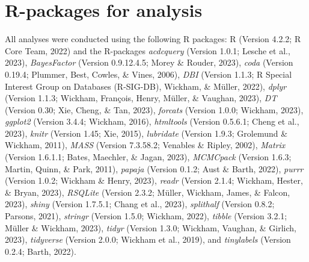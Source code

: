 \documentclass[
  man,floatsintext]{apa6}
\begin{document}
\begin{center}
\begin{ThreePartTable}
{}

\end{ThreePartTable}
\end{center}

\hypertarget{r-packages-for-analysis}{%
\section{R-packages for analysis}\label{r-packages-for-analysis}}

All analyses were conducted using the following R packages: R (Version 4.2.2; R Core Team, 2022) and the R-packages \emph{acdcquery} (Version 1.0.1; Lesche et al., 2023), \emph{BayesFactor} (Version 0.9.12.4.5; Morey \& Rouder, 2023), \emph{coda} (Version 0.19.4; Plummer, Best, Cowles, \& Vines, 2006), \emph{DBI} (Version 1.1.3; R Special Interest Group on Databases (R-SIG-DB), Wickham, \& Müller, 2022), \emph{dplyr} (Version 1.1.3; Wickham, François, Henry, Müller, \& Vaughan, 2023), \emph{DT} (Version 0.30; Xie, Cheng, \& Tan, 2023), \emph{forcats} (Version 1.0.0; Wickham, 2023), \emph{ggplot2} (Version 3.4.4; Wickham, 2016), \emph{htmltools} (Version 0.5.6.1; Cheng et al., 2023), \emph{knitr} (Version 1.45; Xie, 2015), \emph{lubridate} (Version 1.9.3; Grolemund \& Wickham, 2011), \emph{MASS} (Version 7.3.58.2; Venables \& Ripley, 2002), \emph{Matrix} (Version 1.6.1.1; Bates, Maechler, \& Jagan, 2023), \emph{MCMCpack} (Version 1.6.3; Martin, Quinn, \& Park, 2011), \emph{papaja} (Version 0.1.2; Aust \& Barth, 2022), \emph{purrr} (Version 1.0.2; Wickham \& Henry, 2023), \emph{readr} (Version 2.1.4; Wickham, Hester, \& Bryan, 2023), \emph{RSQLite} (Version 2.3.2; Müller, Wickham, James, \& Falcon, 2023), \emph{shiny} (Version 1.7.5.1; Chang et al., 2023), \emph{splithalf} (Version 0.8.2; Parsons, 2021), \emph{stringr} (Version 1.5.0; Wickham, 2022), \emph{tibble} (Version 3.2.1; Müller \& Wickham, 2023), \emph{tidyr} (Version 1.3.0; Wickham, Vaughan, \& Girlich, 2023), \emph{tidyverse} (Version 2.0.0; Wickham et al., 2019), and \emph{tinylabels} (Version 0.2.4; Barth, 2022).
\end{document}
